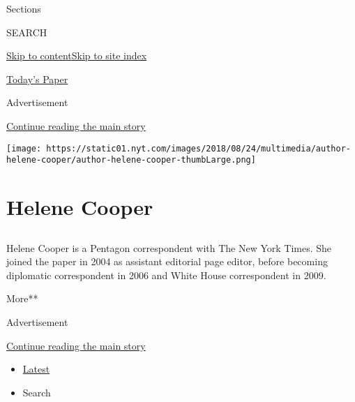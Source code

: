 Sections

SEARCH

\protect\hyperlink{site-content}{Skip to
content}\protect\hyperlink{site-index}{Skip to site index}

\href{https://myaccount.nytimes.com/auth/login?response_type=cookie\&client_id=vi}{}

\href{https://www.nytimes.com/section/todayspaper}{Today's Paper}

Advertisement

\protect\hyperlink{after-top}{Continue reading the main story}

\texttt{[image: https://static01.nyt.com/images/2018/08/24/multimedia/author-helene-cooper/author-helene-cooper-thumbLarge.png]}

\hypertarget{helene-cooper}{%
\section{Helene Cooper}\label{helene-cooper}}

\subsection{}

Helene Cooper is a Pentagon correspondent with The New York Times. She
joined the paper in 2004 as assistant editorial page editor, before
becoming diplomatic correspondent in 2006 and White House correspondent
in 2009.

More**

Advertisement

\protect\hyperlink{after-mid1}{Continue reading the main story}

\begin{itemize}
\tightlist
\item
  \protect\hyperlink{stream-panel}{Latest}
\item
  Search
\end{itemize}

